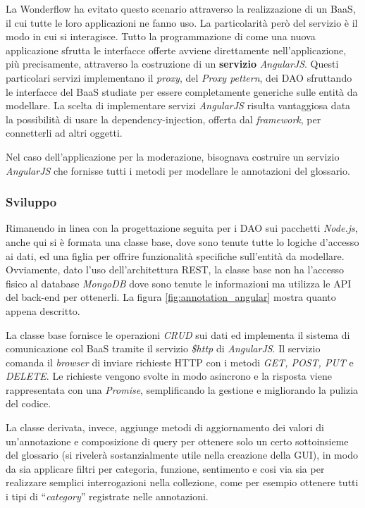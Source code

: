 La Wonderflow ha evitato questo scenario attraverso la realizzazione di un
\gls{BaaS}, il cui tutte le loro applicazioni ne fanno uso. La particolarità
però del servizio è il modo in cui si interagisce. Tutto la programmazione di
come una nuova applicazione sfrutta le interfacce offerte avviene direttamente
nell'applicazione, più precisamente, attraverso la costruzione di un
\textbf{servizio} \textit{AngularJS}. Questi particolari servizi implementano
il \textit{proxy}, del \textit{Proxy pettern}, dei \gls{DAO} sfruttando le
interfacce del \gls{BaaS} studiate per essere completamente generiche
sulle entità da modellare. La scelta di implementare servizi \textit{AngularJS}
risulta vantaggiosa data la possibilità di usare la \gls{dependency-injection},
offerta dal \textit{framework}, per connetterli ad altri oggetti.

Nel caso dell'applicazione per la moderazione, bisognava costruire un servizio
\textit{AngularJS} che fornisse tutti i metodi per modellare le annotazioni del
glossario.

\subsubsection{Sviluppo}
Rimanendo in linea con la progettazione seguita per i \gls{DAO} sui pacchetti
\textit{Node.js}, anche qui si è formata una classe base, dove sono tenute tutte
lo logiche d'accesso ai dati, ed una figlia per offrire funzionalità specifiche
sull'entità da modellare. Ovviamente, dato l'uso dell'architettura
\gls{REST}, la classe base non ha l'accesso fisico al database \textit{MongoDB}
dove sono tenute le informazioni ma utilizza le \gls{API} del \gls{back-end} per
ottenerli. La figura \ref{fig:annotation_angular} mostra quanto appena
descritto.

La classe base fornisce le operazioni \textit{CRUD} sui dati ed implementa il
sistema di comunicazione col \gls{BaaS} tramite il servizio \textit{\$http} di
\textit{AngularJS}. Il servizio comanda il \textit{browser} di inviare richieste
HTTP con i metodi \textit{GET, POST, PUT} e \textit{DELETE}. Le richieste
vengono svolte in modo asincrono e la risposta viene rappresentata con una
\textit{Promise}, semplificando la gestione e migliorando la pulizia del codice.

La classe derivata, invece, aggiunge metodi di aggiornamento dei valori di
un'annotazione e composizione di query per ottenere solo un certo sottoinsieme
del glossario (si rivelerà sostanzialmente utile nella creazione della GUI),
in modo da sia applicare filtri per categoria, funzione, sentimento e cosi via
sia per realizzare semplici interrogazioni nella collezione, come per esempio
ottenere tutti i tipi di ``\textit{category}'' registrate nelle annotazioni.

